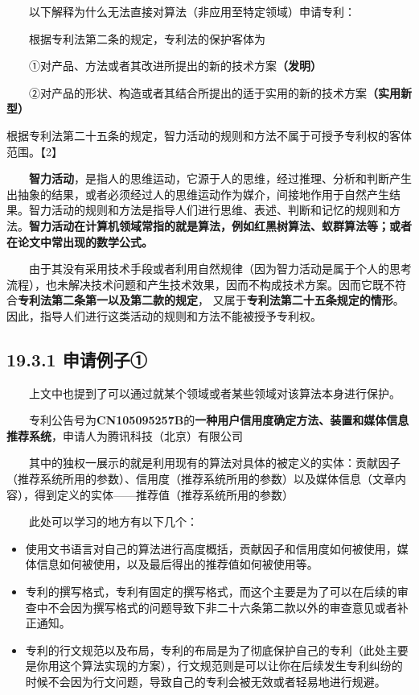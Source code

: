   以下解释为什么无法直接对算法（非应用至特定领域）申请专利：

  根据专利法第二条的规定，专利法的保护客体为

  ①对产品、方法或者其改进所提出的新的技术方案\textbf{（发明）}

  ②对产品的形状、构造或者其结合所提出的适于实用的新的技术方案\textbf{（实用新型）}

根据专利法第二十五条的规定，智力活动的规则和方法不属于可授予专利权的客体范围。【2】

  \textbf{智力活动}，是指人的思维运动，它源于人的思维，经过推理、分析和判断产生出抽象的结果，或者必须经过人的思维运动作为媒介，间接地作用于自然产生结果。智力活动的规则和方法是指导人们进行思维、表述、判断和记忆的规则和方法。\textbf{智力活动在计算机领域常指的就是算法，例如红黑树算法、蚁群算法等；或者在论文中常出现的数学公式。}

  由于其没有采用技术手段或者利用自然规律（因为智力活动是属于个人的思考流程），也未解决技术问题和产生技术效果，因而不构成技术方案。因而它既不符合\textbf{专利法第二条第一以及第二款的规定}，
又属于\textbf{专利法第二十五条规定的情形}。因此，指导人们进行这类活动的规则和方法不能被授予专利权。

\subsection{19.3.1 申请例子①}\label{ux7533ux8bf7ux4f8bux5b50}

  上文中也提到了可以通过就某个领域或者某些领域对该算法本身进行保护。

  专利公告号为\textbf{CN105095257B}的\textbf{一种用户信用度确定方法、装置和媒体信息推荐系统}，申请人为腾讯科技（北京）有限公司

  其中的独权一展示的就是利用现有的算法对具体的被定义的实体：贡献因子（推荐系统所用的参数）、信用度（推荐系统所用的参数）以及媒体信息（文章内容），得到定义的实体------推荐值（推荐系统所用的参数）

  此处可以学习的地方有以下几个：

\begin{itemize}
\item
  使用文书语言对自己的算法进行高度概括，贡献因子和信用度如何被使用，媒体信息如何被使用，以及最后得出的推荐值如何被使用等。
\item
  专利的撰写格式，专利有固定的撰写格式，而这个主要是为了可以在后续的审查中不会因为撰写格式的问题导致下非二十六条第二款以外的审查意见或者补正通知。
\item
  专利的行文规范以及布局，专利的布局是为了彻底保护自己的专利（此处主要是你用这个算法实现的方案），行文规范则是可以让你在后续发生专利纠纷的时候不会因为行文问题，导致自己的专利会被无效或者轻易地进行规避。
\end{itemize}


